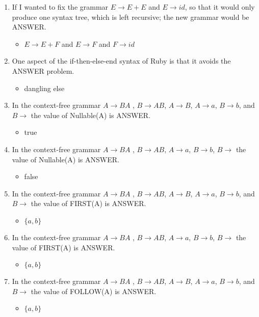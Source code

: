 \documentclass{exam}
\begin{document}
\begin{enumerate}
\item If I wanted to fix the grammar $E \rightarrow E + E$ and $E \rightarrow id$, so that it would only produce one syntax tree, which is left recursive; the new grammar would be ANSWER.
\begin{itemize}
\item $E \rightarrow E + F$ and $E \rightarrow F$ and $F \rightarrow id$
\end{itemize}
\item One aspect of the if-then-else-end syntax of Ruby is that it avoids the ANSWER problem.
\begin{itemize}
\item dangling else
\end{itemize}
\item In the context-free grammar $A \rightarrow B A$ , $B \rightarrow A B$, $A \rightarrow B$, $A \rightarrow a$, $B \rightarrow b$, and $B \rightarrow$  the value of Nullable(A) is ANSWER.
\begin{itemize}
\item true
\end{itemize}
\item In the context-free grammar $A \rightarrow B A$ , $B \rightarrow A B$, $A \rightarrow a$, $B \rightarrow b$, $B \rightarrow$  the value of Nullable(A) is ANSWER.
\begin{itemize}
\item false
\end{itemize}
\item In the context-free grammar $A \rightarrow B A$ , $B \rightarrow A B$, $A \rightarrow B$, $A \rightarrow a$, $B \rightarrow b$, and $B \rightarrow$  the value of FIRST(A) is ANSWER.
\begin{itemize}
\item $\{a,b\}$
\end{itemize}
\item In the context-free grammar $A \rightarrow B A$ , $B \rightarrow A B$, $A \rightarrow a$, $B \rightarrow b$, $B \rightarrow$  the value of FIRST(A) is ANSWER.
\begin{itemize}
\item $\{a,b\}$
\end{itemize}
\item In the context-free grammar $A \rightarrow B A$ , $B \rightarrow A B$, $A \rightarrow B$, $A \rightarrow a$, $B \rightarrow b$, and $B \rightarrow$  the value of FOLLOW(A) is ANSWER.
\begin{itemize}
\item $\{a,b\}$

\end{itemize}
\end{enumerate}
\end{document}

